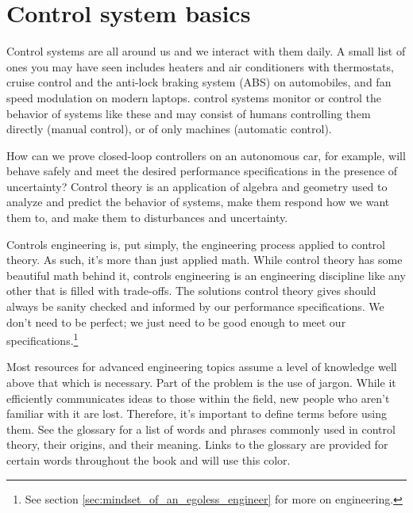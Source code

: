 
\chapter{Control system basics}

Control systems are all around us and we interact with them daily. A small list
of ones you may have seen includes heaters and air conditioners with
thermostats, cruise control and the anti-lock braking system (ABS) on
automobiles, and fan speed modulation on modern laptops. \Glspl{control system}
monitor or control the behavior of \glspl{system} like these and may consist of
humans controlling them directly (manual control), or of only machines
(automatic control).

How can we prove closed-loop \glspl{controller} on an autonomous car, for
example, will behave safely and meet the desired performance specifications in
the presence of uncertainty? Control theory is an application of algebra and
geometry used to analyze and predict the behavior of \glspl{system}, make them
respond how we want them to, and make them  to
\glspl{disturbance} and uncertainty.

Controls engineering is, put simply, the engineering process applied to control
theory. As such, it's more than just applied math. While control theory has some
beautiful math behind it, controls engineering is an engineering discipline like
any other that is filled with trade-offs. The solutions control theory gives
should always be sanity checked and informed by our performance specifications.
We don't need to be perfect; we just need to be good enough to meet our
specifications.\footnote{See section \ref{sec:mindset_of_an_egoless_engineer}
for more on engineering.}
\begin{remark}
  Most resources for advanced engineering topics assume a level of knowledge
  well above that which is necessary. Part of the problem is the use of jargon.
  While it efficiently communicates ideas to those within the field, new people
  who aren't familiar with it are lost. Therefore, it's important to define
  terms before using them. See the glossary for a list of words and phrases
  commonly used in control theory, their origins, and their meaning. Links to
  the glossary are provided for certain words throughout the book and will use
  \textcolor{glscolor}{this color}.
\end{remark}

\renewcommand*{\chapterpath}{\partpath/control-system-basics}





